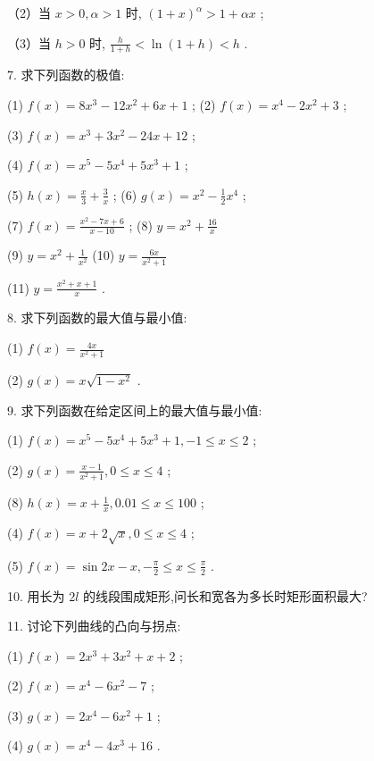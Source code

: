 \documentclass[10pt]{article}
\begin{document}
（2）当 \(x > 0,\alpha > 1\) 时, \({\left( 1 + x\right) }^{\alpha } > 1 + {\alpha x}\) ;

（3）当 \(h > 0\) 时, \(\frac{h}{1 + h} < \ln \left( {1 + h}\right) < h\) .

7. 求下列函数的极值:

(1) \(f\left( x\right) = 8{x}^{3} - {12}{x}^{2} + {6x} + 1\) ; (2) \(f\left( x\right) = {x}^{4} - 2{x}^{2} + 3\) ;

(3) \(f\left( x\right) = {x}^{3} + 3{x}^{2} - {24x} + {12}\) ;

(4) \(f\left( x\right) = {x}^{5} - 5{x}^{4} + 5{x}^{3} + 1\) ;

(5) \(h\left( x\right) = \frac{x}{3} + \frac{3}{x}\) ; (6) \(g\left( x\right) = {x}^{2} - \frac{1}{2}{x}^{4}\) ;

(7) \(f\left( x\right) = \frac{{x}^{2} - {7x} + 6}{x - {10}}\) ; (8) \(y = {x}^{2} + \frac{16}{x}\)

(9) \(y = {x}^{2} + \frac{1}{{x}^{2}}\) (10) \(y = \frac{6x}{{x}^{2} + 1}\)

(11) \(y = \frac{{x}^{2} + x + 1}{x}\) .

8. 求下列函数的最大值与最小值:

(1) \(f\left( x\right) = \frac{4x}{{x}^{2} + 1}\)

(2) \(g\left( x\right) = x\sqrt{1 - {x}^{2}}\) .

9. 求下列函数在给定区间上的最大值与最小值:

(1) \(f\left( x\right) = {x}^{5} - 5{x}^{4} + 5{x}^{3} + 1, - 1 \leq x \leq 2\) ;

(2) \(g\left( x\right) = \frac{x - 1}{{x}^{2} + 1},0 \leq x \leq 4\) ;

(8) \(h\left( x\right) = x + \frac{1}{x},{0.01} \leq x \leq {100}\) ;

(4) \(f\left( x\right) = x + 2\sqrt{x},0 \leq x \leq 4\) ;

(5) \(f\left( x\right) = \sin {2x} - x, - \frac{\pi }{2} \leq x \leq \frac{\pi }{2}\) .

10. 用长为 \({2l}\) 的线段围成矩形,问长和宽各为多长时矩形面积最大?

11. 讨论下列曲线的凸向与拐点:

(1) \(f\left( x\right) = 2{x}^{3} + 3{x}^{2} + x + 2\) ;

(2) \(f\left( x\right) = {x}^{4} - 6{x}^{2} - 7\) ;

(3) \(g\left( x\right) = 2{x}^{4} - 6{x}^{2} + 1\) ;

(4) \(g\left( x\right) = {x}^{4} - 4{x}^{3} + {16}\) .
\end{document}
